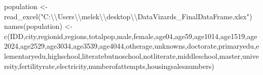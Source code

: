 \documentclass[
  11pt,
  a4paper,
  DIV=11,
  numbers=noendperiod]{scrartcl}
\newenvironment{Shaded}{\begin{snugshade}}{\end{snugshade}}
\newcommand{\FunctionTok}[1]{\textcolor[rgb]{0.28,0.35,0.67}{#1}}
\newcommand{\NormalTok}[1]{\textcolor[rgb]{0.00,0.23,0.31}{#1}}
\newcommand{\OtherTok}[1]{\textcolor[rgb]{0.00,0.23,0.31}{#1}}
\newcommand{\SpecialCharTok}[1]{\textcolor[rgb]{0.37,0.37,0.37}{#1}}
\newcommand{\StringTok}[1]{\textcolor[rgb]{0.13,0.47,0.30}{#1}}
\begin{document}
\begin{Shaded}
\begin{Highlighting}[]
\NormalTok{population }\OtherTok{\textless{}{-}} \FunctionTok{read\_excel}\NormalTok{(}\StringTok{"C:}\SpecialCharTok{\textbackslash{}\textbackslash{}}\StringTok{Users}\SpecialCharTok{\textbackslash{}\textbackslash{}}\StringTok{melek}\SpecialCharTok{\textbackslash{}\textbackslash{}}\StringTok{desktop}\SpecialCharTok{\textbackslash{}\textbackslash{}}\StringTok{DataVizards\_FinalDataFrame.xlsx"}\NormalTok{)}
\FunctionTok{names}\NormalTok{(population) }\OtherTok{\textless{}{-}} \FunctionTok{c}\NormalTok{(}\StringTok{\textquotesingle{}IDD\textquotesingle{}}\NormalTok{,}\StringTok{\textquotesingle{}city\textquotesingle{}}\NormalTok{,}\StringTok{\textquotesingle{}regionid\textquotesingle{}}\NormalTok{,}\StringTok{\textquotesingle{}regions\textquotesingle{}}\NormalTok{,}\StringTok{\textquotesingle{}totalpop\textquotesingle{}}\NormalTok{,}\StringTok{\textquotesingle{}male\textquotesingle{}}\NormalTok{,}\StringTok{\textquotesingle{}female\textquotesingle{}}\NormalTok{,}\StringTok{\textquotesingle{}age04\textquotesingle{}}\NormalTok{,}\StringTok{\textquotesingle{}age59\textquotesingle{}}\NormalTok{,}\StringTok{\textquotesingle{}age1014\textquotesingle{}}\NormalTok{,}\StringTok{\textquotesingle{}age1519\textquotesingle{}}\NormalTok{,}\StringTok{\textquotesingle{}age2024\textquotesingle{}}\NormalTok{,}\StringTok{\textquotesingle{}age2529\textquotesingle{}}\NormalTok{,}\StringTok{\textquotesingle{}age3034\textquotesingle{}}\NormalTok{,}\StringTok{\textquotesingle{}age3539\textquotesingle{}}\NormalTok{,}\StringTok{\textquotesingle{}age4044\textquotesingle{}}\NormalTok{,}\StringTok{\textquotesingle{}otherage\textquotesingle{}}\NormalTok{,}\StringTok{\textquotesingle{}unknowns\textquotesingle{}}\NormalTok{,}\StringTok{\textquotesingle{}doctorate\textquotesingle{}}\NormalTok{,}\StringTok{\textquotesingle{}primaryedu\textquotesingle{}}\NormalTok{,}\StringTok{\textquotesingle{}elementaryedu\textquotesingle{}}\NormalTok{,}\StringTok{\textquotesingle{}highschool\textquotesingle{}}\NormalTok{,}\StringTok{\textquotesingle{}literatebutnoschool\textquotesingle{}}\NormalTok{,}\StringTok{\textquotesingle{}notliterate\textquotesingle{}}\NormalTok{,}\StringTok{\textquotesingle{}middleschool\textquotesingle{}}\NormalTok{,}\StringTok{\textquotesingle{}master\textquotesingle{}}\NormalTok{,}\StringTok{\textquotesingle{}university\textquotesingle{}}\NormalTok{,}\StringTok{\textquotesingle{}fertilityrate\textquotesingle{}}\NormalTok{,}\StringTok{\textquotesingle{}electricity\textquotesingle{}}\NormalTok{,}\StringTok{\textquotesingle{}numberofattempts\textquotesingle{}}\NormalTok{,}\StringTok{\textquotesingle{}housingsalesnumbers\textquotesingle{}}\NormalTok{)}


\end{Highlighting}
\end{Shaded}
\end{document}
